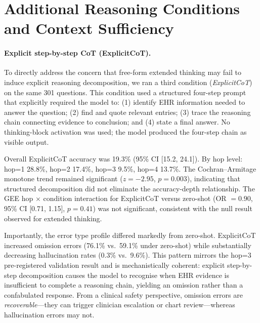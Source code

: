 \documentclass{article}
\begin{document}
\section{Additional Reasoning Conditions and Context Sufficiency}
\label{app:ablations}

\paragraph{Explicit step-by-step CoT (ExplicitCoT).}
To directly address the concern that free-form extended thinking may fail to
induce explicit reasoning decomposition, we ran a third condition
(\textit{ExplicitCoT}) on the same 301 questions.  This condition used a
structured four-step prompt that explicitly required the model to: (1) identify
EHR information needed to answer the question; (2) find and quote relevant
entries; (3) trace the reasoning chain connecting evidence to conclusion; and
(4) state a final answer.  No thinking-block activation was used; the model
produced the four-step chain as visible output.

Overall ExplicitCoT accuracy was 19.3\% (95\% CI [15.2, 24.1]).
By hop level: hop=1 28.8\%, hop=2 17.4\%, hop=3 9.5\%,
hop=4 13.7\%.  The Cochran--Armitage monotone trend remained
significant ($z = -2.95$, $p = 0.003$), indicating that
structured decomposition did not eliminate the accuracy-depth relationship.
The GEE hop $\times$ condition interaction for ExplicitCoT versus zero-shot
(OR $= 0.90$, 95\% CI [0.71, 1.15],
$p = 0.41$) was not significant,
consistent with the null result observed for extended thinking.

Importantly, the error type profile differed markedly from zero-shot.  ExplicitCoT
increased omission errors
(76.1\% vs.\ 59.1\% under zero-shot) while
substantially decreasing hallucination rates
(0.3\% vs.\ 9.6\%).  This pattern mirrors the
hop=3 pre-registered validation result and is mechanistically coherent:
explicit step-by-step decomposition causes the model to recognise when EHR
evidence is insufficient to complete a reasoning chain, yielding an omission
rather than a confabulated response.  From a clinical safety perspective,
omission errors are \emph{recoverable}---they can trigger clinician escalation
or chart review---whereas hallucination errors may not.
\end{document}
